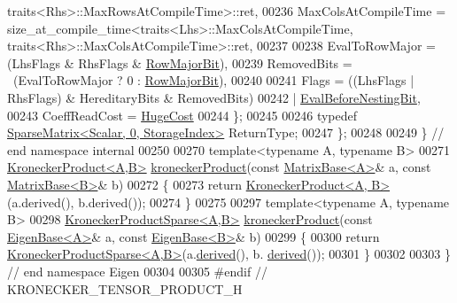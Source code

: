 \begin{DoxyCode}
      traits<Rhs>::MaxRowsAtCompileTime>::ret,
00236     MaxColsAtCompileTime = size\_at\_compile\_time<traits<Lhs>::MaxColsAtCompileTime, 
      traits<Rhs>::MaxColsAtCompileTime>::ret,
00237 
00238     EvalToRowMajor = (LhsFlags & RhsFlags & \hyperlink{group__flags_gae4f56c2a60bbe4bd2e44c5b19cbe8762}{RowMajorBit}),
00239     RemovedBits = ~(EvalToRowMajor ? 0 : \hyperlink{group__flags_gae4f56c2a60bbe4bd2e44c5b19cbe8762}{RowMajorBit}),
00240 
00241     Flags = ((LhsFlags | RhsFlags) & HereditaryBits & RemovedBits)
00242           | \hyperlink{group__flags_gaa34e83bae46a8eeae4e69ebe3aaecbed}{EvalBeforeNestingBit},
00243     CoeffReadCost = \hyperlink{namespace_eigen_a3163430a1c13173faffde69016b48aaf}{HugeCost}
00244   \};
00245 
00246   \textcolor{keyword}{typedef} \hyperlink{group___sparse_core___module_class_eigen_1_1_sparse_matrix}{SparseMatrix<Scalar, 0, StorageIndex>} ReturnType;
00247 \};
00248 
00249 \} \textcolor{comment}{// end namespace internal}
00250 
00270 \textcolor{keyword}{template}<\textcolor{keyword}{typename} A, \textcolor{keyword}{typename} B>
00271 \hyperlink{class_eigen_1_1_kronecker_product}{KroneckerProduct<A,B>} \hyperlink{namespace_eigen_aedd4b7cd1e324ed0769cac2701f4d050}{kroneckerProduct}(\textcolor{keyword}{const} 
      \hyperlink{group___core___module_class_eigen_1_1_matrix_base}{MatrixBase<A>}& a, \textcolor{keyword}{const} \hyperlink{group___core___module_class_eigen_1_1_matrix_base}{MatrixBase<B>}& b)
00272 \{
00273   \textcolor{keywordflow}{return} \hyperlink{class_eigen_1_1_kronecker_product}{KroneckerProduct<A, B>}(a.derived(), b.derived());
00274 \}
00275 
00297 \textcolor{keyword}{template}<\textcolor{keyword}{typename} A, \textcolor{keyword}{typename} B>
00298 \hyperlink{class_eigen_1_1_kronecker_product_sparse}{KroneckerProductSparse<A,B>} \hyperlink{namespace_eigen_aedd4b7cd1e324ed0769cac2701f4d050}{kroneckerProduct}(\textcolor{keyword}{const} 
      \hyperlink{group___core___module_struct_eigen_1_1_eigen_base}{EigenBase<A>}& a, \textcolor{keyword}{const} \hyperlink{group___core___module_struct_eigen_1_1_eigen_base}{EigenBase<B>}& b)
00299 \{
00300   \textcolor{keywordflow}{return} \hyperlink{class_eigen_1_1_kronecker_product_sparse}{KroneckerProductSparse<A,B>}(a.\hyperlink{group___core___module_a324b16961a11d2ecfd2d1b7dd7946545}{derived}(), b.
      \hyperlink{group___core___module_a324b16961a11d2ecfd2d1b7dd7946545}{derived}());
00301 \}
00302 
00303 \} \textcolor{comment}{// end namespace Eigen}
00304 
00305 \textcolor{preprocessor}{#endif // KRONECKER\_TENSOR\_PRODUCT\_H}
\end{DoxyCode}
